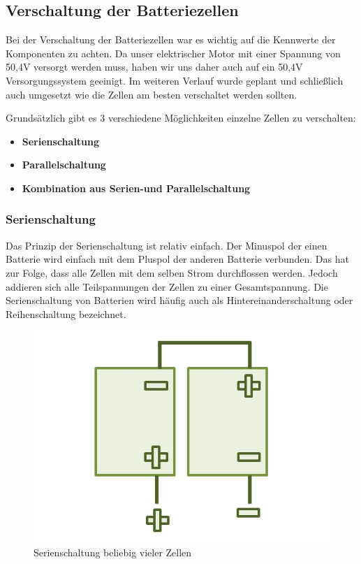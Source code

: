 \subsection{Verschaltung der Batteriezellen}

Bei der Verschaltung der Batteriezellen war es wichtig auf die Kennwerte der Komponenten zu achten. Da unser elektrischer Motor mit einer Spannung von 50,4V versorgt werden muss, haben wir uns daher auch auf ein 50,4V Versorgungssystem geeinigt. Im weiteren Verlauf wurde geplant und schließlich auch umgesetzt wie die Zellen am besten verschaltet werden sollten.

Grundsätzlich gibt es 3 verschiedene Möglichkeiten einzelne Zellen zu verschalten:

\begin{itemize}
\item \textbf{Serienschaltung} 
\item \textbf{Parallelschaltung}
\item \textbf{Kombination aus Serien-und Parallelschaltung}
\end{itemize}

\subsubsection{Serienschaltung}
Das Prinzip der Serienschaltung ist relativ einfach. Der Minuspol der einen Batterie wird einfach mit dem Pluspol der anderen Batterie verbunden. Das hat zur Folge, dass alle Zellen mit dem selben Strom durchflossen werden. Jedoch addieren sich alle Teilspannungen der Zellen zu einer Gesamtspannung. Die Serienschaltung von Batterien wird häufig auch als Hintereinanderschaltung oder Reihenschaltung bezeichnet.

\begin{figure}[H]
	\begin{center}
		\includegraphics[scale=1.0]{figures/Akku/SerienschaltungzweierBatterien.org.jpg}
		\caption{Serienschaltung beliebig vieler Zellen}
	\end{center}
\end{figure}


